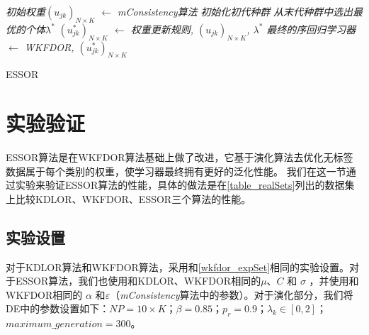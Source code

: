 \IncMargin{1em}
\begin{algorithm}
\emph{初始权重$(u_{jk})_{N \times K}$ $\leftarrow$ \textit{mConsistency}算法}\;
\emph{初始化初代种群}\;
\emph{从末代种群中选出最优的个体$\lambda^{*}$}\;
\emph{$(u_{jk}^{*})_{N \times K}$ $\leftarrow$ 权重更新规则, $(u_{jk})_{N \times K}$, $\lambda^{*}$}\;
\emph{最终的序回归学习器 $\leftarrow$ WKFDOR, $(u_{jk}^{*})_{N \times K}$}\;
\caption{ESSOR}\label{alg_ESSOR}
\end{algorithm}\DecMargin{1em}

\section{实验验证}
ESSOR算法是在WKFDOR算法基础上做了改进，它基于演化算法去优化无标签数据属于每个类别的权重，使学习器最终拥有更好的泛化性能。 我们在这一节通过实验来验证ESSOR算法的性能，具体的做法是在\autoref{table_realSets}列出的数据集上比较KDLOR、WKFDOR、ESSOR三个算法的性能。

\subsection{实验设置}
对于KDLOR算法和WKFDOR算法，采用和\autoref{wkfdor_expSet}相同的实验设置。对于ESSOR算法，我们也使用和KDLOR、WKFDOR相同的\(\mu\)、\(C\) 和 \(\sigma\) ，并使用和WKFDOR相同的 \(\alpha\) 和\(\varepsilon\)（\textit{mConsistency}算法中的参数）。对于演化部分，我们将DE中的参数设置如下：\(NP = 10 \times K\)；\(\beta = 0.85\)；\(p_{r} = 0.9\)；\(\lambda_{k} \in [0,2]\)；\(maximum\_generation = 300\)。


